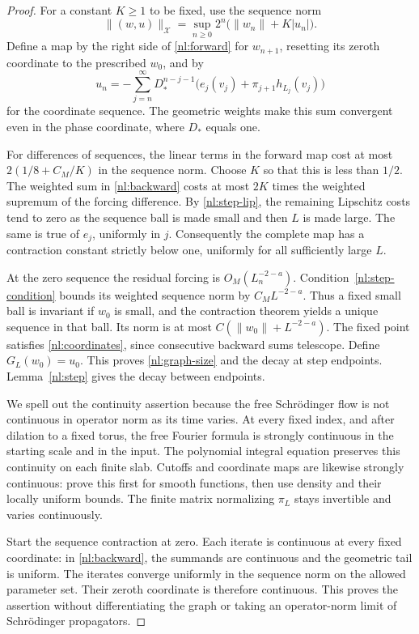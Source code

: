 \documentclass[11pt]{article}
\numberwithin{equation}{section}
\theoremstyle{definition}
\theoremstyle{remark}
\begin{document}
\begin{proof}
For a constant $K\geq1$ to be fixed, use the sequence norm
\[
 \|(w,u)\|_{\mathcal X}
 =\sup_{n\geq0}2^n\bigl(\|w_n\|+K|u_n|\bigr).
\]
Define a map by the right side of \eqref{nl:forward} for $w_{n+1}$,
resetting its zeroth coordinate to the prescribed $w_0$, and by
\begin{equation}\label{nl:backward}
 u_n=-\sum_{j=n}^{\infty}D_*^{n-j-1}
       \bigl(e_j(v_j)+\pi_{j+1}h_{L_j}(v_j)\bigr)
\end{equation}
for the coordinate sequence. The geometric weights make this sum
convergent even in the phase coordinate, where $D_*$ equals one.

For differences of sequences, the linear terms in the forward map cost
at most $2(1/8+C_M/K)$ in the sequence norm. Choose $K$ so that this is
less than $1/2$. The weighted sum in \eqref{nl:backward} costs at most
$2K$ times the weighted supremum of the forcing difference. By
\eqref{nl:step-lip}, the remaining Lipschitz costs tend to zero as the
sequence ball is made small and then $L$ is made large. The same is true
of $e_j$, uniformly in $j$. Consequently the complete map has a
contraction constant strictly below one, uniformly for all sufficiently
large $L$.

At the zero sequence the residual forcing is $O_M(L_n^{-2-a})$.
Condition~\eqref{nl:step-condition} bounds its weighted sequence norm by
$C_M L^{-2-a}$. Thus a fixed small ball is invariant if $w_0$ is small,
and the contraction theorem yields a unique sequence in that ball.
Its norm is at most $C(\|w_0\|+L^{-2-a})$. The fixed point satisfies
\eqref{nl:coordinates}, since consecutive backward sums telescope.
Define $G_L(w_0)=u_0$. This proves \eqref{nl:graph-size} and the decay
at step endpoints. Lemma~\ref{nl:step} gives the decay between endpoints.

We spell out the continuity assertion because the free Schr\"odinger
flow is not continuous in operator norm as its time varies. At every
fixed index, and after dilation to a fixed torus, the free Fourier
formula is strongly continuous in the starting scale and in the input.
The polynomial integral equation preserves this continuity on each
finite slab. Cutoffs and coordinate maps are likewise strongly
continuous: prove this first for smooth functions, then use density and
their locally uniform bounds. The finite matrix normalizing $\pi_L$
stays invertible and varies continuously.

Start the sequence contraction at zero. Each iterate is continuous at
every fixed coordinate: in \eqref{nl:backward}, the summands are
continuous and the geometric tail is uniform. The iterates converge
uniformly in the sequence norm on the allowed parameter set. Their
zeroth coordinate is therefore continuous. This proves the assertion
without differentiating the graph or taking an operator-norm limit of
Schr\"odinger propagators.
\end{proof}
\end{document}
